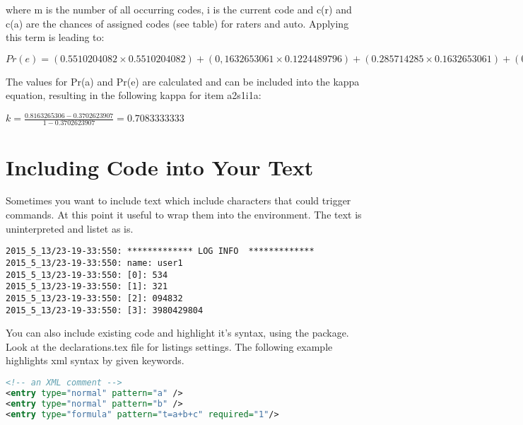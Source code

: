 where m is the number of all occurring codes, i is the current code and c(r) and c(a) are the chances of assigned codes (see table) for raters and auto. Applying this term is leading to:


\begin{center}
$Pr(e) =  (0.5510204082 \times 0.5510204082) + (0,1632653061 \times 0.1224489796) + (0.285714285 \times 0.1632653061) + (0 \times 0) = 0.3702623907$
\end{center}

The values for Pr(a) and Pr(e) are calculated and can be included into the kappa equation, resulting in the following kappa for item a2s1i1a:

\begin{center}
 $k=\frac{0.8163265306 -0.3702623907}{1 - 0.3702623907} = 0.7083333333$
\end{center}


\section{Including Code into Your Text}

Sometimes you want to include text which include characters that could trigger commands. At this point it useful to wrap them into the  environment. The text is uninterpreted and listet as is.

\scriptsize
\begin{verbatim}
2015_5_13/23-19-33:550: ************* LOG INFO  *************
2015_5_13/23-19-33:550: name: user1
2015_5_13/23-19-33:550: [0]: 534
2015_5_13/23-19-33:550: [1]: 321
2015_5_13/23-19-33:550: [2]: 094832
2015_5_13/23-19-33:550: [3]: 3980429804
\end{verbatim}
\normalsize	


You can also include existing code and highlight it's syntax, using the  package. Look at the declarations.tex file for listings settings. The following example highlights xml syntax by given keywords.

\small
\begin{lstlisting}[keywordstyle=\color{blue},language=XML]
<!-- an XML comment -->
<entry type="normal" pattern="a" />
<entry type="normal" pattern="b" />
<entry type="formula" pattern="t=a+b+c" required="1"/>
\end{lstlisting}
\normalsize	

